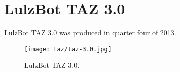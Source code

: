 %
%
%
%
%

\section{LulzBot TAZ 3.0}
LulzBot TAZ 3.0 was produced in quarter four of 2013.

\begin{figure}[h!]
\texttt{[image: taz/taz-3.0.jpg]}
 \caption{LulzBot TAZ 3.0.}
 \label{fig:taz-3.0}
\end{figure}

